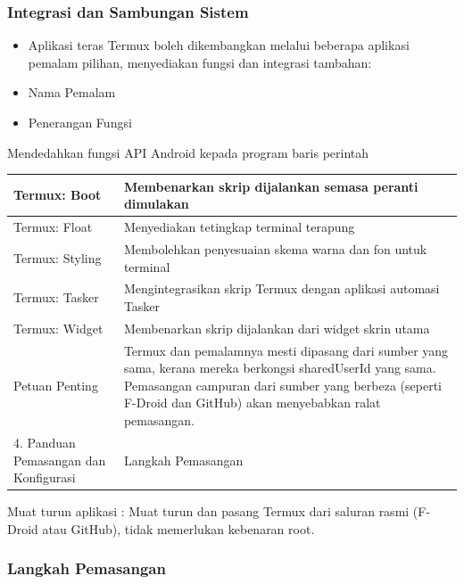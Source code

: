 \subsubsection*{Integrasi dan Sambungan Sistem}

\begin{itemize}
  \item Aplikasi teras Termux boleh dikembangkan melalui beberapa aplikasi pemalam pilihan, menyediakan fungsi dan integrasi tambahan:
  \item Nama Pemalam
  \item Penerangan Fungsi
\end{itemize}


Mendedahkan fungsi API Android kepada program baris perintah

\begin{center}
\begin{tabularx}{\linewidth}{|X|X|}
\hline
\textbf{Termux: Boot} & \textbf{Membenarkan skrip dijalankan semasa peranti dimulakan} \tabularnewline
\hline
Termux: Float & Menyediakan tetingkap terminal terapung \tabularnewline
Termux: Styling & Membolehkan penyesuaian skema warna dan fon untuk terminal \tabularnewline
Termux: Tasker & Mengintegrasikan skrip Termux dengan aplikasi automasi Tasker \tabularnewline
Termux: Widget & Membenarkan skrip dijalankan dari widget skrin utama \tabularnewline
Petuan Penting & Termux dan pemalamnya mesti dipasang dari sumber yang sama, kerana mereka berkongsi sharedUserId yang sama. Pemasangan campuran dari sumber yang berbeza (seperti F-Droid dan GitHub) akan menyebabkan ralat pemasangan. \tabularnewline
4. Panduan Pemasangan dan Konfigurasi & Langkah Pemasangan \tabularnewline
\hline
\end{tabularx}
\end{center}

\begin{tcbwarn}{Muat turun aplikasi}
: Muat turun dan pasang Termux dari saluran rasmi (F-Droid atau GitHub), tidak memerlukan kebenaran root.

\end{tcbwarn}


\subsubsection*{Langkah Pemasangan}

